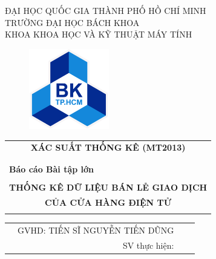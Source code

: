 \documentclass{article}
\begin{document}
\lstset{style=myStyle}
\begin{titlepage}
\begin{center}
    \large ĐẠI HỌC QUỐC GIA THÀNH PHỐ HỒ CHÍ MINH \\
    TRƯỜNG ĐẠI HỌC BÁCH KHOA \\
    KHOA KHOA HỌC VÀ KỸ THUẬT MÁY TÍNH
\end{center}

\vspace{1.5cm}

\begin{figure}[!ht]
    \centering \includegraphics[width=3.5cm]{Images/bachkhoa_logo.png}
\end{figure}

\vspace{1.5cm}

\begin{table}[H]
    \centering
    \begin{tabular}{c}
    {\bf \Large XÁC SUẤT THỐNG KÊ (MT2013)} \\ \\
    \hline  \\
    \multicolumn{1}{l}{{\bf \large Báo cáo Bài tập lớn}}    \\  \\
    {\bf \huge THỐNG KÊ DỮ LIỆU BÁN LẺ GIAO DỊCH}     \\  
    {\bf \huge  CỦA CỬA HÀNG ĐIỆN TỬ}     \\  \\
    \hline
    \end{tabular}
\end{table}

\vspace{1.5cm}

\begin{table}[h]
\centering
\begin{tabular}{lrlc}

\hspace{0 cm} & GVHD: TIẾN SĨ NGUYỄN TIẾN DŨNG & \vspace{0.5cm}\\
& SV thực hiện: &  
 	

\end{tabular}
\end{table}
\end{titlepage}
\end{document}
